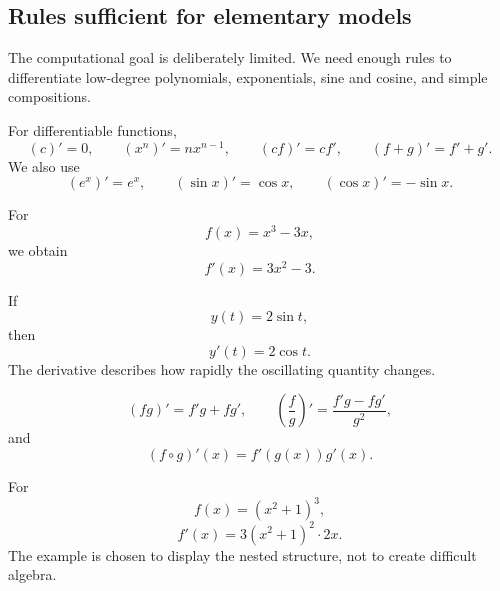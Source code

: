 \subsection{Rules sufficient for elementary models}

The computational goal is deliberately limited. We need enough rules to differentiate low-degree polynomials, exponentials, sine and cosine, and simple compositions.

\begin{theorembox}
For differentiable functions,
\[
(c)'=0,
\qquad
(x^n)'=nx^{n-1},
\qquad
(cf)'=cf',
\qquad
(f+g)'=f'+g'.
\]
We also use
\[
(e^x)'=e^x,
\qquad
(\sin x)'=\cos x,
\qquad
(\cos x)'=-\sin x.
\]
\end{theorembox}

\begin{examplebox}[A polynomial]
For
\[
f(x)=x^3-3x,
\]
we obtain
\[
f'(x)=3x^2-3.
\]
\end{examplebox}

\begin{examplebox}
If
\[
y(t)=2\sin t,
\]
then
\[
y'(t)=2\cos t.
\]
The derivative describes how rapidly the oscillating quantity changes.
\end{examplebox}

\begin{theorembox}
\[
(fg)'=f'g+fg',
\qquad
\left(\frac{f}{g}\right)'=\frac{f'g-fg'}{g^2},
\]
and
\[
(f\circ g)'(x)=f'(g(x))g'(x).
\]
\end{theorembox}

\begin{examplebox}
For
\[
f(x)=(x^2+1)^3,
\]
\[
f'(x)=3(x^2+1)^2\cdot2x.
\]
The example is chosen to display the nested structure, not to create difficult algebra.
\end{examplebox}
